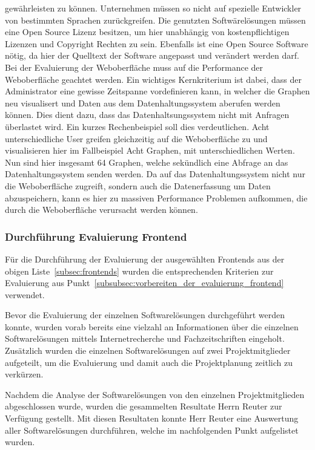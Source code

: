 \begin{outline}
  gewährleisten zu können. Unternehmen müssen so nicht auf spezielle
  Entwickler von bestimmten Sprachen zurückgreifen.
  \1 Die genutzten Softwärelösungen müssen eine Open Source Lizenz besitzen, um
  hier unabhängig von kostenpflichtigen Lizenzen und Copyright Rechten zu sein.
  Ebenfalls ist eine Open Source Software nötig, da hier der Quelltext der
  Software angepasst und verändert werden darf.
  \1 Bei der Evaluierung der Weboberfläche muss auf die Performance der
  Weboberfläche geachtet werden. Ein wichtiges Kernkriterium ist dabei, dass
  der Administrator eine gewisse Zeitspanne vordefinieren kann, in welcher die
  Graphen neu visualisert und Daten aus dem Datenhaltungssystem aberufen werden
  können. Dies dient dazu, dass das Datenhaltsungssystem nicht mit Anfragen
  überlastet wird. Ein kurzes Rechenbeispiel soll dies verdeutlichen. Acht
  unterschiedliche User greifen gleichzeitig auf die Weboberfläche zu und
  visualisieren hier im Fallbeispiel Acht Graphen, mit unterschiedlichen
  Werten. Nun sind hier insgesamt 64 Graphen, welche sekündlich eine Abfrage an
  das Datenhaltungssystem senden werden. Da auf das Datenhaltungssystem nicht
  nur die Weboberfläche zugreift, sondern auch die Datenerfassung um Daten
  abzuspeichern, kann es hier zu massiven Performance Problemen aufkommen, die
  durch die Weboberfläche verursacht werden können.
\end{outline}
\mr%

\subsubsection{Durchführung Evaluierung Frontend}
\label{subsubsec:durchfuehrung_evaluierung_frontend}
Für die Durchführung der Evaluierung der ausgewählten Frontends aus der obigen
Liste~\ref{subsec:frontends} wurden die entsprechenden Kriterien zur
Evaluierung aus Punkt~\ref{subsubsec:vorbereiten_der_evaluierung_frontend}
verwendet.


Bevor die Evaluierung der einzelnen Softwarelösungen durchgeführt werden konnte,
wurden vorab bereits eine vielzahl an Informationen über die einzelnen
Softwarelösungen mittels Internetrecherche und Fachzeitschriften eingeholt.
Zusätzlich wurden die einzelnen Softwarelösungen auf zwei Projektmitglieder
aufgeteilt, um die Evaluierung und damit auch die Projektplanung zeitlich zu
verkürzen.

Nachdem die Analyse der Softwarelösungen von den einzelnen Projektmitglieden
abgeschlossen wurde, wurden die gesammelten Resultate Herrn Reuter zur
Verfügung gestellt. Mit diesen Resultaten konnte Herr Reuter eine Auswertung
aller Softwarelösungen durchführen, welche im nachfolgenden Punkt aufgelistet
wurden.

